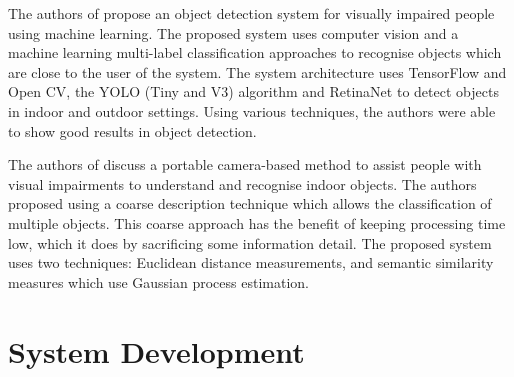 \documentclass{svproc}
\begin{document}
The authors of \cite{b24} propose an object detection system for visually impaired people using machine learning. The proposed system uses 
computer vision and a machine learning multi-label classification approaches to recognise objects which are close to the user of the system. 
The system architecture uses TensorFlow and Open CV, the YOLO (Tiny and V3) algorithm and RetinaNet to detect objects in indoor and 
outdoor settings. Using various techniques, the authors were able to show good results in object detection.

The authors of \cite{b25} discuss a portable camera-based method to assist people with visual impairments to understand and recognise 
indoor objects. The authors proposed using a coarse description technique which allows the classification of multiple objects. This coarse approach 
has the benefit of keeping processing time low, which it does by sacrificing some information detail. The proposed system uses two 
techniques: Euclidean distance measurements, and semantic similarity measures which use Gaussian process estimation.

\section{System Development}
\end{document}
